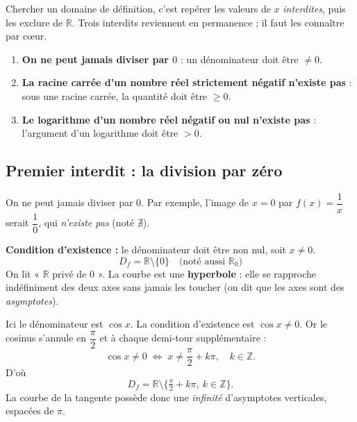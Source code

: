 \documentclass[11pt,a4paper]{article}
\newcommand{\R}{\mathbb{R}}
\newcommand{\Z}{\mathbb{Z}}
\newcommand{\Df}{D_f}
\begin{document}
Chercher un domaine de définition, c'est repérer les valeurs de $x$ \emph{interdites},
puis les exclure de $\R$. Trois interdits reviennent en permanence ; il faut les
connaître par cœur.

\begin{attention}
\begin{enumerate}[leftmargin=1.8em,topsep=2pt,itemsep=2pt]
  \item \textbf{On ne peut jamais diviser par $0$} : un dénominateur doit être $\neq 0$.
  \item \textbf{La racine carrée d'un nombre réel strictement négatif n'existe pas} : sous une racine carrée, la quantité doit être $\geq 0$.
  \item \textbf{Le logarithme d'un nombre réel négatif ou nul n'existe pas} : l'argument d'un logarithme doit être $>0$.
\end{enumerate}
\end{attention}

\subsection{Premier interdit : la division par zéro}

On ne peut jamais diviser par $0$. Par exemple, l'image de $x=0$ par $f(x)=\dfrac1x$
serait $\dfrac10$, qui \emph{n'existe pas} (noté $\nexists$).

\begin{exemple}[Fonction inverse $f(x)=\frac1x$]
\textbf{Condition d'existence :} le dénominateur doit être non nul, soit $x\neq 0$.
\[
  \boxed{\;\Df = \R\setminus\{0\}\quad\text{(noté aussi }\R_0\text{)}\;}
\]
On lit « $\R$ privé de $0$ ». La courbe est une \textbf{hyperbole} : elle se rapproche
indéfiniment des deux axes sans jamais les toucher (on dit que les axes sont des
\emph{asymptotes}).
\end{exemple}

\begin{exemple}[Fonction tangente $f(x)=\tan x = \frac{\sin x}{\cos x}$]
Ici le dénominateur est $\cos x$. La condition d'existence est $\cos x \neq 0$.
Or le cosinus s'annule en $\dfrac{\pi}{2}$ et à chaque demi-tour supplémentaire :
\[
  \cos x \neq 0 \;\Longleftrightarrow\; x \neq \frac{\pi}{2} + k\pi,\quad k\in\Z.
\]
D'où
\[
  \boxed{\;\Df = \R\setminus\Big\{\tfrac{\pi}{2}+k\pi,\ k\in\Z\Big\}.\;}
\]
La courbe de la tangente possède donc une \emph{infinité} d'asymptotes verticales,
espacées de $\pi$.
\end{exemple}
\end{document}
